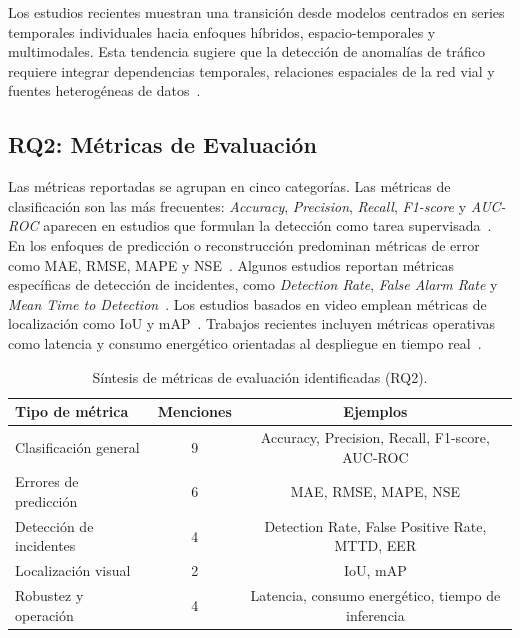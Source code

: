 \documentclass[12pt, a4paper]{article}
\begin{document}
\begin{hallazgo}[]
Los estudios recientes muestran una transici\'{o}n desde modelos centrados en series temporales individuales hacia enfoques h\'{i}bridos, espacio-temporales y multimodales. Esta tendencia sugiere que la detecci\'{o}n de anomal\'{i}as de tr\'{a}fico requiere integrar dependencias temporales, relaciones espaciales de la red vial y fuentes heterog\'{e}neas de datos~\cite{duan2025multimodal,park2025graph}.
\end{hallazgo}

\subsection{RQ2: M\'{e}tricas de Evaluaci\'{o}n}

Las m\'{e}tricas reportadas se agrupan en cinco categor\'{i}as. Las m\'{e}tricas de clasificaci\'{o}n son las m\'{a}s frecuentes: \textit{Accuracy}, \textit{Precision}, \textit{Recall}, \textit{F1-score} y \textit{AUC-ROC} aparecen en estudios que formulan la detecci\'{o}n como tarea supervisada~\cite{khan2022anomaly,jadhav2025multistage,duan2025multimodal}. En los enfoques de predicci\'{o}n o reconstrucci\'{o}n predominan m\'{e}tricas de error como MAE, RMSE, MAPE y NSE~\cite{ren2024graph,jia2025prediction}. Algunos estudios reportan m\'{e}tricas espec\'{i}ficas de detecci\'{o}n de incidentes, como \textit{Detection Rate}, \textit{False Alarm Rate} y \textit{Mean Time to Detection}~\cite{fang2020deep}. Los estudios basados en video emplean m\'{e}tricas de localizaci\'{o}n como IoU y mAP~\cite{huang2020intelligent,pawar2022deep}. Trabajos recientes incluyen m\'{e}tricas operativas como latencia y consumo energ\'{e}tico orientadas al despliegue en tiempo real~\cite{abdallah2025aipurban}.

\begin{table}[H]
\centering
\caption{S\'{i}ntesis de m\'{e}tricas de evaluaci\'{o}n identificadas (RQ2).}
\label{tab:rq2}
\small
\begin{tabularx}{\linewidth}{Xcc}
\toprule
\textbf{Tipo de m\'{e}trica} & \textbf{Menciones} & \textbf{Ejemplos} \\
\midrule
Clasificaci\'{o}n general          & 9 & Accuracy, Precision, Recall, F1-score, AUC-ROC \\
Errores de predicci\'{o}n          & 6 & MAE, RMSE, MAPE, NSE \\
Detecci\'{o}n de incidentes        & 4 & Detection Rate, False Positive Rate, MTTD, EER \\
Localizaci\'{o}n visual            & 2 & IoU, mAP \\
Robustez y operaci\'{o}n           & 4 & Latencia, consumo energ\'{e}tico, tiempo de inferencia \\
\bottomrule
\end{tabularx}
\end{table}
\end{document}
